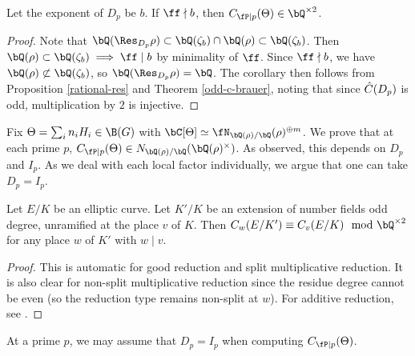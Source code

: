 \begin{cor}\label{rational-res-2}
    Let the exponent of $D_p$ be $b$. If $\ff \nmid b$, then $C_{\fP \mid p}(\Theta) \in \bQ^{\times 2}$.
\end{cor}

\begin{proof}
    Note that $\bQ(\Res_{D_p}{\rho}) \subset \bQ(\zeta_b) \cap \bQ(\rho) \subset \bQ(\zeta_b)$. Then $\bQ(\rho) \subset \bQ(\zeta_b) \implies \ff \mid b$ by minimality of $\ff$. Since $\ff \nmid b$, we have $\bQ(\rho) \not\subset \bQ(\zeta_b)$, so $\bQ(\Res_{D_p} \rho) = \bQ$. The corollary then follows from Proposition \ref{rational-res} and Theorem \ref{odd-c-brauer}, noting that since $\hat{C}(D_p)$ is odd, multiplication by $2$ is injective. 
\end{proof}

Fix $\Theta = \sum_i n_i H_i \in \B(G)$ with $\bC[\Theta] \simeq \repnorm{\rho}^{\oplus m}$. We prove that at each prime $p$, $C_{\fP \mid p}(\Theta) \in \fieldnorm{\rho}$.  As observed, this depends on $D_p$ and $I_p$. As we deal with each local factor individually, we argue that one can take $D_p = I_p$.

\begin{lemma}\label{tam-up-to-square}
    Let $E / K$ be an elliptic curve. Let $K' / K$ be an extension of number fields odd degree, unramified at the place $v$ of $K$. Then $C_w(E / K') \equiv C_v(E / K) \mod \bQ^{\times 2}$ for any place $w$ of $K'$ with $ w \mid v$. 
\end{lemma}

\begin{proof}
This is automatic for good reduction and split multiplicative reduction. It is also clear for non-split multiplicative reduction since the residue degree cannot be even (so the reduction type remains non-split at $w$). For additive reduction, see \cite[Lemma 3.12]{reg-const}.
\end{proof}

\begin{lemma}\label{DeqI}
    At a prime $p$, we may assume that $D_p = I_p$ when computing $C_{\fP \mid p}(\Theta)$. 
\end{lemma}

